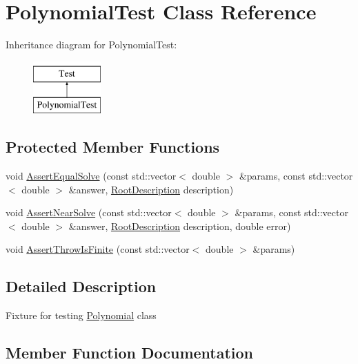 \hypertarget{class_polynomial_test}{}\section{Polynomial\+Test Class Reference}
\label{class_polynomial_test}
Inheritance diagram for Polynomial\+Test\+:\begin{figure}[H]
\begin{center}
\leavevmode
\includegraphics[height=2.000000cm]{class_polynomial_test}
\end{center}
\end{figure}
\subsection*{Protected Member Functions}
\begin{DoxyCompactItemize}
\item 
void \mbox{\hyperlink{class_polynomial_test_a4c48313f8592ad80809b7cb7e94fb4e8}{Assert\+Equal\+Solve}} (const std\+::vector$<$ double $>$ \&params, const std\+::vector$<$ double $>$ \&answer, \mbox{\hyperlink{_polynomial_8h_a4d41a8f81d16e61db1ddcce54a5f2586}{Root\+Description}} description)
\item 
void \mbox{\hyperlink{class_polynomial_test_aea4b36db491bd58b640c98eed525ce82}{Assert\+Near\+Solve}} (const std\+::vector$<$ double $>$ \&params, const std\+::vector$<$ double $>$ \&answer, \mbox{\hyperlink{_polynomial_8h_a4d41a8f81d16e61db1ddcce54a5f2586}{Root\+Description}} description, double error)
\item 
void \mbox{\hyperlink{class_polynomial_test_a8c21881fa8afd2134e49ffad8c3c1214}{Assert\+Throw\+Is\+Finite}} (const std\+::vector$<$ double $>$ \&params)
\end{DoxyCompactItemize}


\subsection{Detailed Description}
Fixture for testing \mbox{\hyperlink{class_polynomial}{Polynomial}} class 

\subsection{Member Function Documentation}
\mbox{\label{class_polynomial_test_a4c48313f8592ad80809b7cb7e94fb4e8}} 
